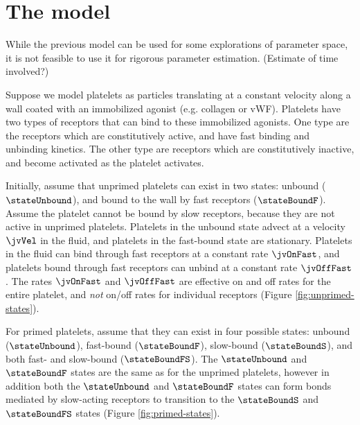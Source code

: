 \section{The model}
\label{sec:jv-model}

While the previous model can be used for some explorations of parameter
space, it is not feasible to use it for rigorous parameter
estimation. {\color{red} (Estimate of time involved?)}

Suppose we model platelets as particles translating at a constant
velocity along a wall coated with an immobilized agonist (e.g. collagen
or vWF). Platelets have two types of receptors that can bind to these
immobilized agonists. One type are the receptors which are
constitutively active, and have fast binding and unbinding kinetics. The
other type are receptors which are constitutively inactive, and become
activated as the platelet activates. 

Initially, assume that unprimed platelets can exist in two states:
unbound ($\stateUnbound$), and bound to the wall by fast receptors
($\stateBoundF$). Assume the platelet cannot be bound by slow receptors,
because they are not active in unprimed platelets. Platelets in the
unbound state advect at a velocity $\jvVel$ in the fluid, and platelets
in the fast-bound state are stationary. Platelets in the fluid can bind
through fast receptors at a constant rate $\jvOnFast$, and platelets
bound through fast receptors can unbind at a constant rate
$\jvOffFast$. The rates $\jvOnFast$ and $\jvOffFast$ are effective on
and off rates for the entire platelet, and \emph{not} on/off rates for
individual receptors (Figure \ref{fig:unprimed-states}).


For primed platelets, assume that they can exist in four possible
states: unbound ($\stateUnbound$), fast-bound ($\stateBoundF$),
slow-bound ($\stateBoundS$), and both fast- and slow-bound
($\stateBoundFS$). The $\stateUnbound$ and $\stateBoundF$ states are
the same as for the unprimed platelets, however in addition both the
$\stateUnbound$ and $\stateBoundF$ states can form bonds mediated by
slow-acting receptors to transition to the $\stateBoundS$ and
$\stateBoundFS$ states (Figure \ref{fig:primed-states}).

